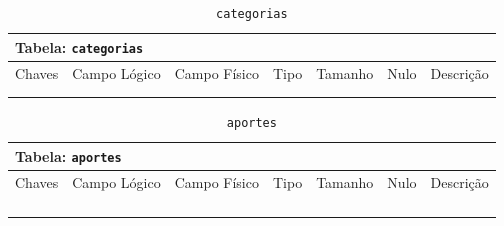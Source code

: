 \documentclass[12pt,a4paper]{article}
\begin{document}
\begin{center}
\begin{table}[h!]
	\caption{\texttt{categorias}}
	\label{tabela:categorias}
	\begin{tabular}{|p{1cm}|p{1.5cm}|p{1.25cm}|p{1.25cm}|p{1.75cm}|p{1.25cm}|p{4.5cm}|}\hline	
		\multicolumn{7}{|p{16cm}|}{\cellcolor{cinzaClaro}  \centering Tabela: \texttt{categorias}} \\ \hline %
		{\small Chaves} & {\small Campo Lógico} & {\small Campo Físico} & {\small Tipo} & {\small Tamanho} & {\small Nulo} & {\small Descrição}\\\hline %
		
		{\tiny } & {\tiny } & {\tiny } & {\tiny } & {\tiny } & {\tiny } &{\tiny }\\\hline
		{\tiny } & {\tiny } & {\tiny } & {\tiny } & {\tiny } & {\tiny } &{\tiny }\\\hline
		
			
	\end{tabular}
\end{table}	
\end{center}

\begin{center}
\begin{table}[h!]
	\caption{\texttt{aportes}}
	\label{tabela:aportes}
	\begin{tabular}{|p{1cm}|p{1.5cm}|p{1.25cm}|p{1.25cm}|p{1.75cm}|p{1.25cm}|p{4.5cm}|}\hline	
		\multicolumn{7}{|p{16cm}|}{\cellcolor{cinzaClaro}  \centering Tabela: \texttt{aportes}} \\ \hline %
		{\small Chaves} & {\small Campo Lógico} & {\small Campo Físico} & {\small Tipo} & {\small Tamanho} & {\small Nulo} & {\small Descrição}\\\hline %
		
		{\tiny } & {\tiny } & {\tiny } & {\tiny } & {\tiny } & {\tiny } &{\tiny }\\\hline
		{\tiny } & {\tiny } & {\tiny } & {\tiny } & {\tiny } & {\tiny } &{\tiny }\\\hline
		{\tiny } & {\tiny } & {\tiny } & {\tiny } & {\tiny } & {\tiny } &{\tiny }\\\hline
		{\tiny } & {\tiny } & {\tiny } & {\tiny } & {\tiny } & {\tiny } &{\tiny }\\\hline
		
			
	\end{tabular}
\end{table}	
\end{center}
\end{document}
